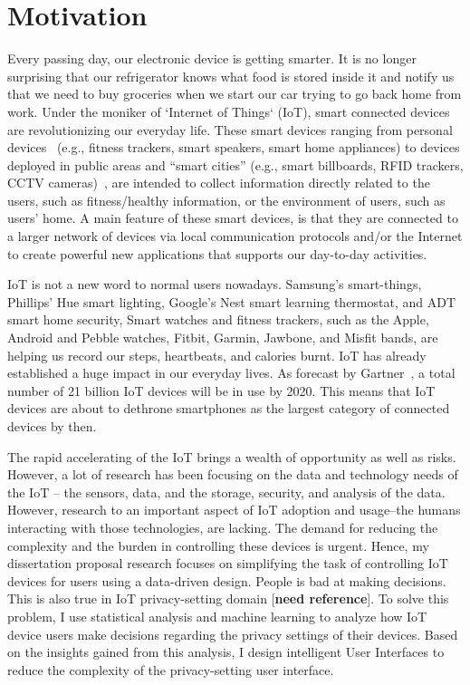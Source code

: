 \chapter{Motivation}\label{motivation}\label{chapter:Motivation}

Every passing day, our electronic device is getting smarter. It is no longer surprising that our refrigerator knows what food is stored inside it and notify us that we need to buy groceries when we start our car trying to go back home from work. Under the moniker of `Internet of Things` (IoT), smart connected devices are revolutionizing our everyday life. These smart devices ranging from personal devices~\cite{bahirat_exploring_2018,he_data_nodate} (e.g., fitness trackers, smart speakers, smart home appliances) to devices deployed in public areas and ``smart cities'' (e.g., smart billboards, RFID trackers, CCTV cameras)~\cite{bahirat2018data,lee_privacy_2017,pappachan_towards_2017}, are intended to collect information directly related to the users, such as fitness/healthy information, or the environment of users, such as users' home. A main feature of these smart devices, is that they are connected to a larger network of devices via local communication protocols and/or the Internet to create powerful new applications that supports our day-to-day activities. 

IoT is not a new word to normal users nowadays. Samsung's smart-things, Phillips' Hue smart lighting, Google's Nest smart learning thermostat, and ADT smart home security, Smart watches and fitness trackers, such as the Apple, Android and Pebble watches, Fitbit, Garmin, Jawbone, and Misfit bands, are helping us record our steps, heartbeats, and calories burnt. IoT has already established a huge impact in our everyday lives. As forecast by Gartner~\cite{van_der_meulen_gartner_nodate}, a total number of 21 billion IoT devices will be in use by 2020. This means that IoT devices are about to dethrone smartphones as the largest category of connected devices by then.

The rapid accelerating of the IoT brings a wealth of opportunity as well as risks. However, a lot of research has been focusing on the data and technology needs of the IoT -- the sensors, data, and the storage, security, and analysis of the data. However, research to an important aspect of IoT adoption and usage--the humans interacting with those technologies, are lacking. The demand for reducing the complexity and the burden in controlling these devices is urgent. Hence, my dissertation proposal research focuses on simplifying the task of controlling IoT devices for users using a data-driven design. People is bad at making decisions. This is also true in IoT privacy-setting domain [\textbf{need reference}]. To solve this problem, I use statistical analysis and machine learning to analyze how IoT device users make decisions regarding the privacy settings of their devices. Based on the insights gained from this analysis, I design intelligent User Interfaces to reduce the complexity of the privacy-setting user interface.


